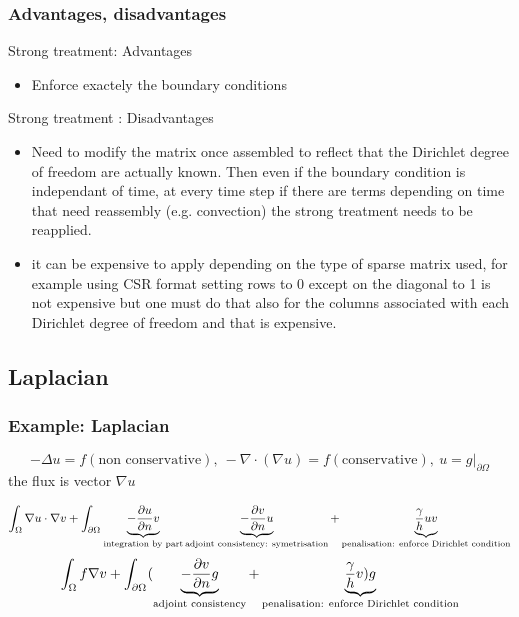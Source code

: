\subsubsection{Advantages, disadvantages}
  \begin{remark}{Strong treatment: Advantages}
    \begin{itemize}
    \item Enforce exactely the boundary conditions
    \end{itemize}
  \end{remark}
  \begin{remark}{Strong treatment : Disadvantages}
    \begin{itemize}
    \item Need to modify the matrix once assembled to reflect that
      the Dirichlet degree of freedom are actually known. Then
          even if the boundary condition is independant of time, at
          every time step if there are terms depending on time that
          need reassembly (e.g. convection) the strong treatment needs to be reapplied.
        \item it can be expensive to apply depending on the type of
          sparse matrix used, for example using CSR format setting
          rows to 0 except on the diagonal to 1 is not expensive but
          one must do that also for the columns associated with each
          Dirichlet degree of freedom and that is expensive.
        \end{itemize}
      \end{remark}

\subsection{Laplacian}
\subsubsection{Example: Laplacian}
  \begin{equation}
    \label{notes:eq:44}
    -\Delta u = f (\text{non conservative}),\ -\nabla\cdot( \nabla u )= f (\text{conservative}),\ u=g|_{\partial \Omega}
  \end{equation}
  the flux is vector $\nabla u$

  \begin{equation}
    \label{notes:eq:51}
    \int_\Omega \nabla u \cdot \nabla v + \int_{\partial {\ensuremath{\Omega^{}}}} \underbrace{-\frac{\partial u}{\partial n}v}_{\text{integration by part}} \underbrace{-\frac{\partial v}{\partial n} u}_{\text{adjoint consistency: symetrisation}}  + \underbrace{\frac{\gamma}{h} u v}_{\text{penalisation: enforce Dirichlet condition}}
  \end{equation}
  \begin{equation}
    \label{notes:eq:52}
    \int_\Omega f \nabla v + \int_{\partial {\ensuremath{\Omega^{}}}} (\underbrace{-\frac{\partial v}{\partial n} g}_{\text{adjoint consistency}} + \underbrace{\frac{\gamma}{h} v) g}_{\text{penalisation: enforce Dirichlet condition}}
  \end{equation}


